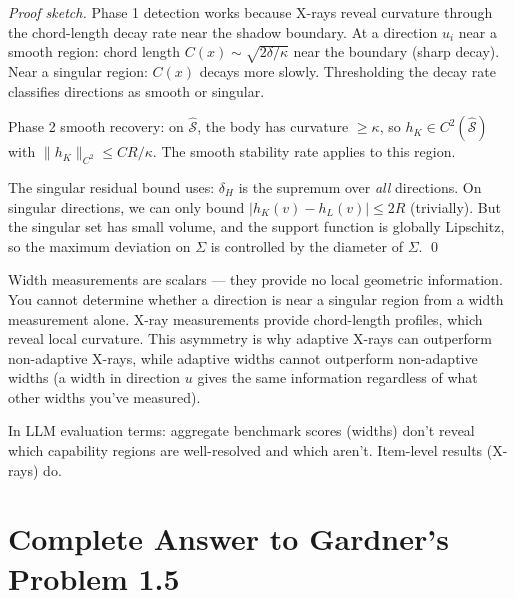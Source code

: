 \begin{proof}[Proof sketch]
Phase 1 detection works because X-rays reveal curvature through the chord-length decay rate near the shadow boundary. At a direction $u_i$ near a smooth region: chord length $C(x) \sim \sqrt{2\delta/\kappa}$ near the boundary (sharp decay). Near a singular region: $C(x)$ decays more slowly. Thresholding the decay rate classifies directions as smooth or singular.

Phase 2 smooth recovery: on $\hat{\mathcal{S}}$, the body has curvature $\geq \kappa$, so $h_K \in C^2(\hat{\mathcal{S}})$ with $\|h_K\|_{C^2} \leq CR/\kappa$. The smooth stability rate applies to this region.

The singular residual bound uses: $\delta_H$ is the supremum over \emph{all} directions. On singular directions, we can only bound $|h_K(v) - h_L(v)| \leq 2R$ (trivially). But the singular set has small volume, and the support function is globally Lipschitz, so the maximum deviation on $\Sigma$ is controlled by the diameter of $\Sigma$. \qed
\end{proof}

\begin{remark}
Width measurements are scalars — they provide no local geometric information. You cannot determine whether a direction is near a singular region from a width measurement alone. X-ray measurements provide chord-length profiles, which reveal local curvature. This asymmetry is why adaptive X-rays can outperform non-adaptive X-rays, while adaptive widths cannot outperform non-adaptive widths (a width in direction $u$ gives the same information regardless of what other widths you've measured).

In LLM evaluation terms: aggregate benchmark scores (widths) don't reveal which capability regions are well-resolved and which aren't. Item-level results (X-rays) do.
\end{remark}


\section{Complete Answer to Gardner's Problem 1.5}

